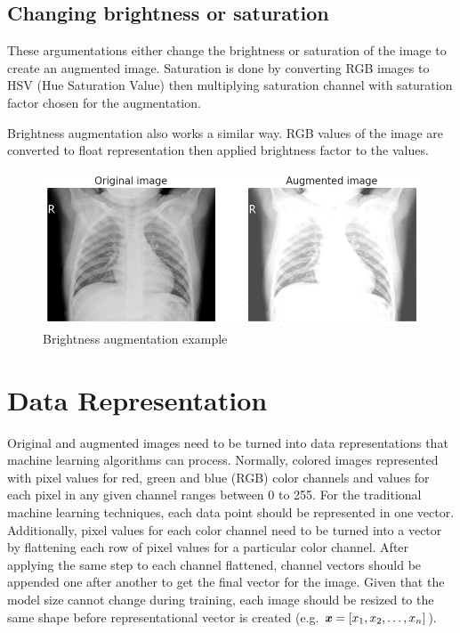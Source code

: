 \subsection{Changing brightness or saturation} \label{subsec:brightness}
These argumentations either change the brightness or saturation of the image to create an augmented image.
Saturation is done by converting RGB images to HSV (Hue Saturation Value) then multiplying saturation channel with saturation factor chosen for the augmentation.

Brightness augmentation also works a similar way.
RGB values of the image are converted to float representation then applied brightness factor to the values.

\begin{figure}[H]
    \centering
    \includegraphics[width=\textwidth]{img/augmented-image-1596666691.png}
    \caption{Brightness augmentation example}
    \label{fig:brightedxray}
\end{figure}


\section{Data Representation} \label{sec:datarepresentation}
Original and augmented images need to be turned into data representations that machine learning algorithms can process.
Normally, colored images represented with pixel values for red, green and blue (RGB) color channels and values for each pixel in any given channel ranges between 0 to 255.
For the traditional machine learning techniques, each data point should be represented in one vector.
Additionally, pixel values for each color channel need to be turned into a vector by flattening each row of pixel values for a particular color channel.
After applying the same step to each channel flattened, channel vectors should be appended one after another to get the final vector for the image.
Given that the model size cannot change during training, each image should be resized to the same shape before representational vector is created (e.g. $\textbf{\textit{x}} = [x_1, x_2, \ldots, x_n]$).

